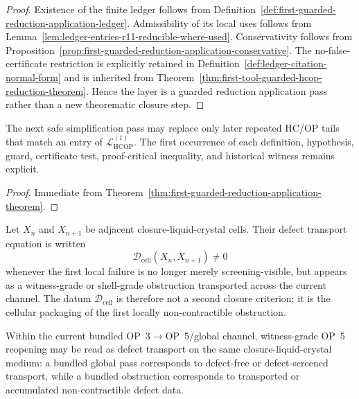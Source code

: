 \begin{proof}
Existence of the finite ledger follows from Definition~\ref{def:first-guarded-reduction-application-ledger}.  Admissibility of its local uses follows from Lemma~\ref{lem:ledger-entries-r11-reducible-where-used}.  Conservativity follows from Proposition~\ref{prop:first-guarded-reduction-application-conservative}.  The no-false-certificate restriction is explicitly retained in Definition~\ref{def:ledger-citation-normal-form} and is inherited from Theorem~\ref{thm:first-tool-guarded-hcop-reduction-theorem}.  Hence the layer is a guarded reduction application pass rather than a new theorematic closure step.
\end{proof}

\begin{corollary}
\label{cor:v3340-r12-working-rule}
The next safe simplification pass may replace only later repeated HC/OP tails that match an entry of \(\mathcal L_{\mathrm{HCOP}}^{(1)}\).  The first occurrence of each definition, hypothesis, guard, certificate test, proof-critical inequality, and historical witness remains explicit.
\end{corollary}

\begin{proof}
Immediate from Theorem~\ref{thm:first-guarded-reduction-application-theorem}.
\end{proof}

\begin{definition}
\label{def:defect-transport-equation}
Let $X_n$ and $X_{n+1}$ be adjacent closure-liquid-crystal cells. Their defect transport equation is written
\[
  \mathcal D_{\mathrm{cell}}(X_n,X_{n+1})\neq 0
\]
whenever the first local failure is no longer merely screening-visible, but appears as a witness-grade or shell-grade obstruction transported across the current channel. The datum $\mathcal D_{\mathrm{cell}}$ is therefore not a second closure criterion; it is the cellular packaging of the first locally non-contractible obstruction.
\end{definition}

\begin{proposition}
\label{prop:op5-defect-transport-reading}
Within the current bundled OP~3$\to$OP~5/global channel, witness-grade OP~5 reopening may be read as defect transport on the same closure-liquid-crystal medium: a bundled global pass corresponds to defect-free or defect-screened transport, while a bundled obstruction corresponds to transported or accumulated non-contractible defect data.
\end{proposition}

